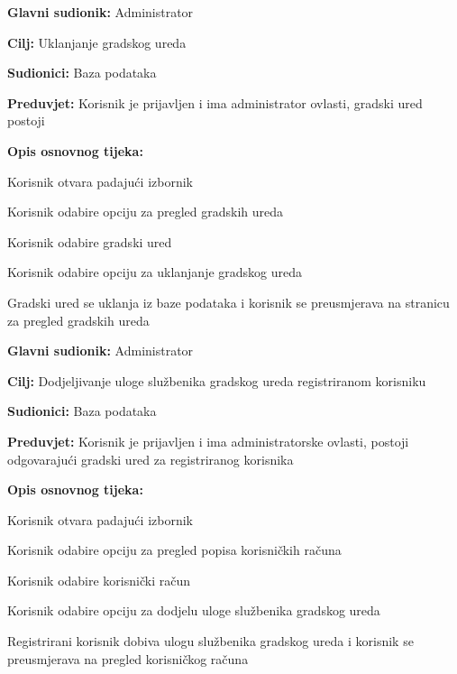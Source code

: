 \noindent {}
\begin{packed_item}

	\item \textbf{Glavni sudionik: }Administrator
	\item  \textbf{Cilj:} Uklanjanje gradskog ureda
	\item  \textbf{Sudionici:} Baza podataka
	\item  \textbf{Preduvjet:} Korisnik je prijavljen i ima administrator ovlasti, gradski ured postoji
	\item  \textbf{Opis osnovnog tijeka:}

	\item[] \begin{packed_enum}

		\item Korisnik otvara padajući izbornik
		\item Korisnik odabire opciju za pregled gradskih ureda
		\item Korisnik odabire gradski ured
		\item Korisnik odabire opciju za uklanjanje gradskog ureda 
		\item Gradski ured se uklanja iz baze podataka i korisnik se preusmjerava na stranicu za pregled gradskih ureda
	\end{packed_enum}
\end{packed_item}


\noindent {}
\begin{packed_item}

	\item \textbf{Glavni sudionik: }Administrator
	\item  \textbf{Cilj:} Dodjeljivanje uloge službenika gradskog ureda registriranom korisniku
	\item  \textbf{Sudionici:} Baza podataka
	\item  \textbf{Preduvjet:} Korisnik je prijavljen i ima administratorske ovlasti, postoji odgovarajući gradski ured za registriranog korisnika
	\item  \textbf{Opis osnovnog tijeka:}

	\item[] \begin{packed_enum}

		\item Korisnik otvara padajući izbornik 
		\item Korisnik odabire opciju za pregled popisa korisničkih računa
		\item Korisnik odabire korisnički račun
		\item Korisnik odabire opciju za dodjelu uloge službenika gradskog ureda
		\item Registrirani korisnik dobiva ulogu službenika gradskog ureda i korisnik se preusmjerava na pregled korisničkog računa
	\end{packed_enum}
\end{packed_item}


